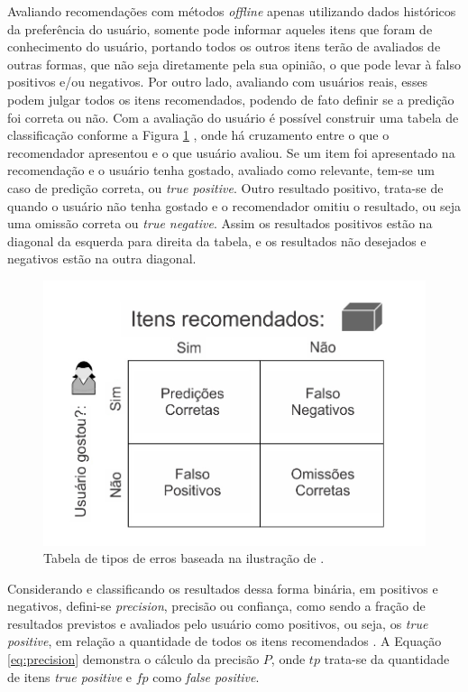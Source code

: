 Avaliando recomendações com métodos \textit{offline} apenas utilizando dados históricos da preferência do usuário, somente pode informar aqueles itens que foram de conhecimento do usuário, portando todos os outros itens terão de avaliados de outras formas, que não seja diretamente pela sua opinião, o que pode levar à falso positivos e/ou negativos. Por outro lado, avaliando com usuários reais, esses podem julgar todos os itens recomendados, podendo de fato definir se a predição foi correta ou não. Com a avaliação do usuário é possível construir uma tabela de classificação conforme a Figura \ref{fig:truth_table} \citep{Jannach:2010}, onde há cruzamento entre o que o recomendador apresentou e o que usuário avaliou. Se um item foi apresentado na recomendação e o usuário tenha gostado, avaliado como relevante, tem-se um caso de predição correta, ou \textit{true positive}. Outro resultado positivo, trata-se de quando o usuário não tenha gostado e o recomendador omitiu o resultado, ou seja uma omissão correta ou \textit{true negative}. Assim os resultados positivos estão na diagonal da esquerda para direita da tabela, e os resultados não desejados e negativos estão na outra diagonal. 

\begin{figure}
	\centering
	\includegraphics[scale=0.4]{imagens/truth_table.jpg}
	\caption{Tabela de tipos de erros baseada na ilustração de \cite{Jannach:2010}.}
	\label{fig:truth_table}
\end{figure}

Considerando e classificando os resultados dessa forma binária, em positivos e negativos, defini-se \textit{precision}, precisão ou confiança, como sendo a fração de resultados previstos e avaliados pelo usuário como positivos, ou seja, os \textit{true positive}, em relação a quantidade de todos os itens recomendados \citep{Powers_2008}. A Equação \ref{eq:precision} demonstra o cálculo da precisão $P$, onde $tp$ trata-se da quantidade de itens \textit{true positive} e $fp$ como \textit{false positive}.

